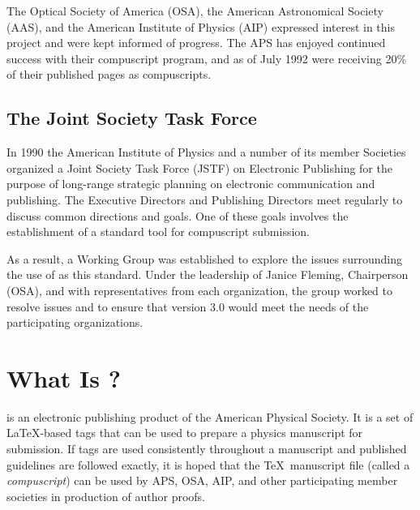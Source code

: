 {      The Optical Society of America (OSA), the American Astronomical
Society (AAS), and the American Institute of Physics (AIP) expressed
interest in this project and were kept informed of progress.  The APS has
enjoyed continued success with their compuscript program, and as of July
1992 were receiving 20\% of their published pages as compuscripts.




\subsection*{The Joint Society Task Force}

      In 1990 the American Institute of Physics and a number of its member
Societies organized a Joint Society Task Force (JSTF) on Electronic
Publishing for the purpose of long-range strategic planning on electronic
communication and publishing.  The Executive Directors and Publishing
Directors meet regularly to discuss common directions and goals.  One of
these goals involves the establishment of a standard tool for compuscript
submission.

      As a result, a \REVTeX{} Working Group was established to explore
the issues surrounding the use of \REVTeX{} as this standard.  Under the
leadership of Janice Fleming, Chairperson (OSA), and with representatives
from each organization, the group worked to resolve issues and to ensure
that \REVTeX{} version 3.0 would meet the needs of the participating
organizations.

\newpage


}




\section{What Is \REVTeX{}?}

\REVTeX{} is an electronic publishing product of the American Physical
Society.  It is a set of \LaTeX-based tags that can be used to prepare a
physics manuscript for submission. If \REVTeX{} tags are used consistently
throughout a manuscript and published guidelines are followed exactly, it
is hoped that the \TeX\ manuscript file (called a {\it compuscript}) can be
used by APS, OSA, AIP, and other participating member societies in
production of  author proofs.

